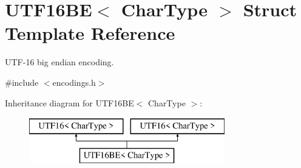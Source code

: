 \hypertarget{struct_u_t_f16_b_e}{}\section{U\+T\+F16\+BE$<$ Char\+Type $>$ Struct Template Reference}
\label{struct_u_t_f16_b_e}


U\+T\+F-\/16 big endian encoding.  




{\ttfamily \#include $<$encodings.\+h$>$}

Inheritance diagram for U\+T\+F16\+BE$<$ Char\+Type $>$\+:\begin{figure}[H]
\begin{center}
\leavevmode
\includegraphics[height=2.000000cm]{struct_u_t_f16_b_e}
\end{center}
\end{figure}
